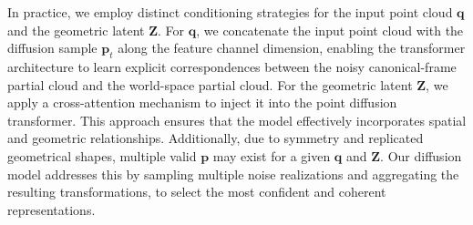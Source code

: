 In practice, we employ distinct conditioning strategies for the input point cloud $\bm{q}$ and the geometric latent $\bm{Z}$. For $\bm{q}$, we concatenate the input point cloud with the diffusion sample $\bm{p}_t$ along the feature channel dimension, enabling the transformer architecture to learn explicit correspondences between the noisy canonical-frame partial cloud and the world-space partial cloud.
%
For the geometric latent $\bm{Z}$, we apply a cross-attention mechanism to inject it into the point diffusion transformer. This approach ensures that the model effectively incorporates spatial and geometric relationships.
%
Additionally, due to symmetry and replicated geometrical shapes, multiple valid $\bm{p}$ may exist for a given $\bm{q}$ and $\bm{Z}$. Our diffusion model addresses this by sampling multiple noise realizations and aggregating the resulting transformations, to select the most confident and coherent representations.

% 
% 
% 



